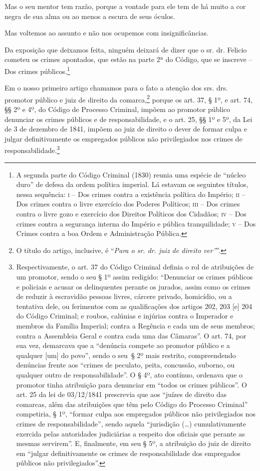 Mas o seu mentor tem razão, porque a vontade para ele tem de há muito a
cor negra de sua alma ou ao menos a escura de seus óculos.

Mas voltemos ao assunto e não nos ocupemos com insignificâncias.

Da exposição que deixamos feita, ninguém deixará de dizer que o sr. dr.
Felicio cometeu os crimes apontados, que estão na parte 2ª do Código,
que se inscreve -- Dos crimes públicos.\footnote{ A segunda parte do
  Código Criminal (1830) reunia uma espécie de ``núcleo duro'' de defesa
  da ordem política imperial. Lá estavam os seguintes títulos, nessa
  sequência: \textsc{i} -- Dos crimes contra a existência política do Império; \textsc{ii}
  -- Dos crimes contra o livre exercício dos Poderes Políticos; \textsc{iii} --
  Dos crimes contra o livre gozo e exercício dos Direitos Políticos dos
  Cidadãos; \textsc{iv} -- Dos crimes contra a segurança interna do Império e
  pública tranquilidade; \textsc{v} -- Dos Crimes contra a boa Ordem e
  Administração Pública.}

Em o nosso primeiro artigo chamamos para o fato a atenção dos srs. drs.
promotor público e juiz de direito da comarca,\footnote{ O título do
  artigo, inclusive, é ``\emph{Para o sr. dr. juiz de direito ver''}''.}
porque os art. 37, § 1º, e art. 74, §§ 2º e 4º, do Código de Processo
Criminal, impõem ao promotor público denunciar os crimes públicos e de
responsabilidade, e o art. 25, §§ 1º e 5º, da Lei de 3 de dezembro de
1841, impõem ao juiz de direito o dever de formar culpa e julgar
definitivamente os empregados públicos não privilegiados nos crimes de
responsabilidade.\footnote{ Respectivamente, o art. 37 do Código
  Criminal definia o rol de atribuições de um promotor, sendo o seu § 1º
  assim redigido: ``Denunciar os crimes públicos e policiais e acusar os
  delinquentes perante os jurados, assim como os crimes de reduzir à
  escravidão pessoas livres, cárcere privado, homicídio, ou a tentativa
  dele, ou ferimentos com as qualificações dos artigos 202, 203 {[}e{]}
  204 do Código Criminal; e roubos, calúnias e injúrias contra o
  Imperador e membros da Família Imperial; contra a Regência e cada um
  de seus membros; contra a Assembleia Geral e contra cada uma das
  Câmaras''. O art. 74, por sua vez, demarcava que a ``denúncia compete ao
  promotor público e a qualquer {[}um{]} do povo'', sendo o seu~§ 2º mais
  restrito, compreendendo denúncias frente aos ``crimes de peculato,
  peita, concussão, suborno, ou qualquer outro de responsabilidade''. O §
  4º, ato contínuo, ordenava que o promotor tinha atribuição para
  denunciar em ``todos os crimes públicos''. O art. 25 da lei de
  03/12/1841 prescrevia que aos ``juízes de direito das comarcas, além
  das atribuições que têm pelo Código do Processo Criminal'' competiria,
  § 1º, ``formar culpa aos empregados públicos não privilegiados nos
  crimes de responsabilidade'', sendo aquela ``jurisdição (\ldots{})
  cumulativamente exercida pelas autoridades judiciárias a respeito dos
  oficiais que perante as mesmas servirem''. E, finalmente, em seu § 5º,
  a atribuição do juiz de direito em ``julgar definitivamente os crimes
  de responsabilidade dos empregados públicos não privilegiados''.}

